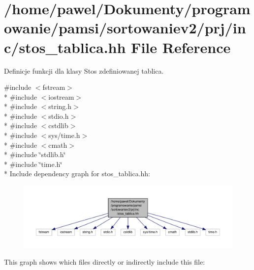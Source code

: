 \hypertarget{stos__tablica_8hh}{\section{/home/pawel/\-Dokumenty/programowanie/pamsi/sortowaniev2/prj/inc/stos\-\_\-tablica.hh File Reference}
\label{stos__tablica_8hh}
}


Definicje funkcji dla klasy Stos zdefiniowanej tablica.  


{\ttfamily \#include $<$fstream$>$}\\*
{\ttfamily \#include $<$iostream$>$}\\*
{\ttfamily \#include $<$string.\-h$>$}\\*
{\ttfamily \#include $<$stdio.\-h$>$}\\*
{\ttfamily \#include $<$cstdlib$>$}\\*
{\ttfamily \#include $<$sys/time.\-h$>$}\\*
{\ttfamily \#include $<$cmath$>$}\\*
{\ttfamily \#include \char`\"{}stdlib.\-h\char`\"{}}\\*
{\ttfamily \#include \char`\"{}time.\-h\char`\"{}}\\*
Include dependency graph for stos\-\_\-tablica.\-hh\-:\nopagebreak
\begin{figure}[H]
\begin{center}
\leavevmode
\includegraphics[width=350pt]{stos__tablica_8hh__incl}
\end{center}
\end{figure}
This graph shows which files directly or indirectly include this file\-:\nopagebreak
